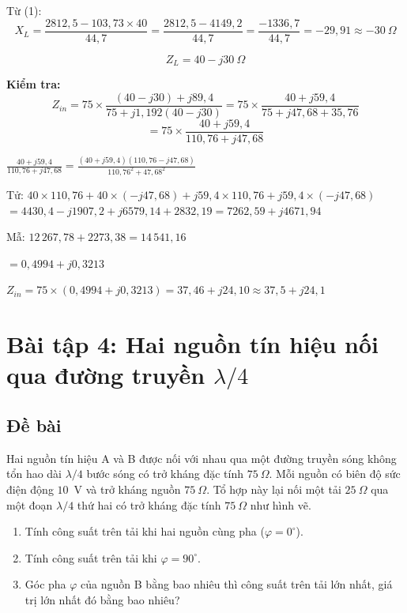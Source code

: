 \documentclass[12pt,a4paper]{article}
\begin{document}
Từ (1):
\[
X_L = \frac{2812{,}5 - 103{,}73 \times 40}{44{,}7} = \frac{2812{,}5 - 4149{,}2}{44{,}7} = \frac{-1336{,}7}{44{,}7} = -29{,}91 \approx -30~\Omega
\]

\[
\boxed{Z_L = 40 - j30~\Omega}
\]

\textbf{Kiểm tra:}
\[
Z_{in} = 75 \times \frac{(40 - j30) + j89{,}4}{75 + j1{,}192(40 - j30)}
= 75 \times \frac{40 + j59{,}4}{75 + j47{,}68 + 35{,}76}
\]
\[
= 75 \times \frac{40 + j59{,}4}{110{,}76 + j47{,}68}
\]

$\frac{40 + j59{,}4}{110{,}76 + j47{,}68} = \frac{(40 + j59{,}4)(110{,}76 - j47{,}68)}{110{,}76^2 + 47{,}68^2}$

Tử: $40 \times 110{,}76 + 40 \times (-j47{,}68) + j59{,}4 \times 110{,}76 + j59{,}4 \times (-j47{,}68)$
$= 4430{,}4 - j1907{,}2 + j6579{,}14 + 2832{,}19 = 7262{,}59 + j4671{,}94$

Mẫ: $12\,267{,}78 + 2273{,}38 = 14\,541{,}16$

$= 0{,}4994 + j0{,}3213$

$Z_{in} = 75 \times (0{,}4994 + j0{,}3213) = 37{,}46 + j24{,}10 \approx 37{,}5 + j24{,}1$ \checkmark

\newpage
\section{Bài tập 4: Hai nguồn tín hiệu nối qua đường truyền $\lambda/4$}

\subsection{Đề bài}
Hai nguồn tín hiệu A và B được nối với nhau qua một đường truyền sóng không tổn hao dài $\lambda/4$ bước sóng có trở kháng đặc tính $75~\Omega$. Mỗi nguồn có biên độ sức điện động $10$~V và trở kháng nguồn $75~\Omega$. Tổ hợp này lại nối một tải $25~\Omega$ qua một đoạn $\lambda/4$ thứ hai có trở kháng đặc tính $75~\Omega$ như hình vẽ.

\begin{enumerate}
    \item[(a)] Tính công suất trên tải khi hai nguồn cùng pha ($\varphi = 0^\circ$).
    \item[(b)] Tính công suất trên tải khi $\varphi = 90^\circ$.
    \item[(c)] Góc pha $\varphi$ của nguồn B bằng bao nhiêu thì công suất trên tải lớn nhất, giá trị lớn nhất đó bằng bao nhiêu?
\end{enumerate}
\end{document}
